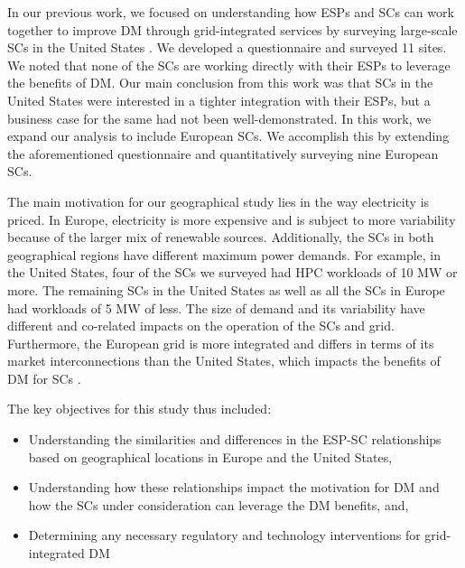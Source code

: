 In our previous work, we focused on understanding how ESPs and SCs can work together to improve DM through grid-integrated services by surveying large-scale SCs in the United States \cite{BatesESP}. We developed a questionnaire and surveyed 11 sites. We noted that none of the SCs are working directly with their ESPs to leverage the benefits of DM. Our main conclusion from this work was that SCs in the United States were interested in a tighter integration with their ESPs, but a business case for the same had not been well-demonstrated. In this work, we expand our analysis to include European SCs. We accomplish this by extending the aforementioned questionnaire and quantitatively surveying nine European SCs. 


The main motivation for our geographical study lies in the way electricity is priced. In Europe, electricity is more expensive and is subject to more variability because of the larger mix of renewable sources. Additionally, the SCs in both geographical regions have different maximum power demands. For example, in the United States, four of the SCs we surveyed had HPC workloads of 10 MW or more. The remaining SCs in the United States as well as all the SCs in Europe had workloads of 5 MW of less. The size of demand and its variability have different and co-related impacts on the operation of the SCs and grid. Furthermore, the European grid is more integrated and differs in terms of its market interconnections than the United States, which impacts the benefits of DM for SCs \cite{clausen2014load}. 

The key objectives for this study thus included:

\begin{itemize}
\item{Understanding the similarities and differences in the ESP-SC relationships based on geographical locations in Europe and the United States,}
\item{Understanding how these relationships impact the motivation for DM and how the SCs under consideration can leverage the DM benefits, and,}
\item{Determining any necessary regulatory and technology interventions for grid-integrated DM}
\end{itemize}

